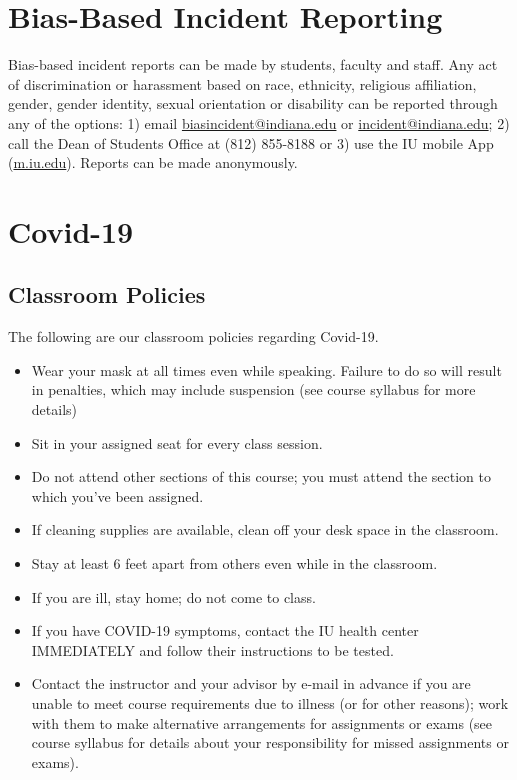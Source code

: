 \documentclass[12pt]{article} %
\begin{document}
\section{Bias-Based Incident Reporting}
Bias-based incident reports can be made by students, faculty and staff. Any act of discrimination or harassment based on race, ethnicity, religious affiliation, gender, gender identity, sexual orientation or disability can be reported through any of the options: 1) email \url{biasincident@indiana.edu} or \url{incident@indiana.edu}; 2) call the Dean of Students Office at (812) 855-8188 or 3) use the IU mobile App (\url{m.iu.edu}). Reports can be made anonymously.

\section{Covid-19}
\subsection{Classroom Policies}
The following are our classroom policies regarding Covid-19. 
\begin{itemize}
	\item Wear your mask at all times even while speaking.  Failure to do so will result in penalties, which may include suspension (see course syllabus for more details)
	\item Sit in your assigned seat for every class session.
	\item Do not attend other sections of this course; you must attend the section to which you’ve been assigned.
	\item If cleaning supplies are available, clean off your desk space in the classroom.
	\item Stay at least 6 feet apart from others even while in the classroom.
	\item If you are ill, stay home; do not come to class.
	\item If you have COVID-19 symptoms, contact the IU health center IMMEDIATELY and follow their instructions to be tested.
	\item Contact the instructor and your advisor by e-mail in advance if you are unable to meet course requirements due to illness (or for other reasons); work with them to make alternative arrangements for assignments or exams (see course syllabus for details about your responsibility for missed assignments or exams).
\end{itemize}
\end{document}

